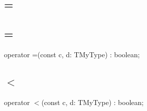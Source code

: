 \documentclass{report}
\newif\ifpdf
\begin{document}
\subsection*{\large{\textbf{=}}\normalsize\hspace{1ex}\hrulefill}
\else
\subsection*{=}
\fi
\label{ok_operator_test-=}
\index{=}
\begin{list}{}{
\setlength{\itemindent}{0cm}
\setlength{\listparindent}{0cm}
\setlength{\leftmargin}{\evensidemargin}
\addtolength{\leftmargin}{\tmplength}
\settowidth{\labelsep}{X}
\addtolength{\leftmargin}{\labelsep}
\setlength{\labelwidth}{\tmplength}
}
\item[\textbf{Declaration}\hfill]
\ifpdf
\begin{flushleft}
\fi
\begin{ttfamily}
operator =(const c, d: TMyType) : boolean;\end{ttfamily}

\ifpdf
\end{flushleft}
\fi

\end{list}
\ifpdf
\subsection*{\large{\textbf{{$<$}}}\normalsize\hspace{1ex}\hrulefill}
\else
\subsection*{{$<$}}
\fi
\label{ok_operator_test-<}
\index{{$<$}}
\begin{list}{}{
\setlength{\itemindent}{0cm}
\setlength{\listparindent}{0cm}
\setlength{\leftmargin}{\evensidemargin}
\addtolength{\leftmargin}{\tmplength}
\settowidth{\labelsep}{X}
\addtolength{\leftmargin}{\labelsep}
\setlength{\labelwidth}{\tmplength}
}
\item[\textbf{Declaration}\hfill]
\ifpdf
\begin{flushleft}
\fi
\begin{ttfamily}
operator {$<$}(const c, d: TMyType) : boolean;\end{ttfamily}

\ifpdf
\end{flushleft}
\fi

\end{list}
\ifpdf
\end{document}

